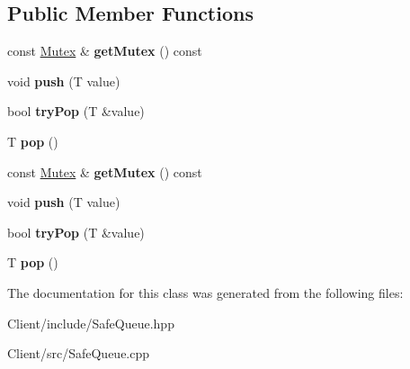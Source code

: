 \subsection*{Public Member Functions}
\begin{DoxyCompactItemize}
\item 
const \hyperlink{class_mutex}{Mutex} \& {\bfseries get\+Mutex} () const \hypertarget{class_safe_queue_aad9b14ab0aaff6244e49d9e408dc04eb}{}\label{class_safe_queue_aad9b14ab0aaff6244e49d9e408dc04eb}

\item 
void {\bfseries push} (T value)\hypertarget{class_safe_queue_adb651a088d5c4cdbfa3183d425323eaa}{}\label{class_safe_queue_adb651a088d5c4cdbfa3183d425323eaa}

\item 
bool {\bfseries try\+Pop} (T \&value)\hypertarget{class_safe_queue_ab2f40bad1a39f332c1a8c7b4e858b190}{}\label{class_safe_queue_ab2f40bad1a39f332c1a8c7b4e858b190}

\item 
T {\bfseries pop} ()\hypertarget{class_safe_queue_a0e893adb076b76dfce803b068af53482}{}\label{class_safe_queue_a0e893adb076b76dfce803b068af53482}

\item 
const \hyperlink{class_mutex}{Mutex} \& {\bfseries get\+Mutex} () const \hypertarget{class_safe_queue_a98cf46e343ed213b69368d10aaf76058}{}\label{class_safe_queue_a98cf46e343ed213b69368d10aaf76058}

\item 
void {\bfseries push} (T value)\hypertarget{class_safe_queue_adb651a088d5c4cdbfa3183d425323eaa}{}\label{class_safe_queue_adb651a088d5c4cdbfa3183d425323eaa}

\item 
bool {\bfseries try\+Pop} (T \&value)\hypertarget{class_safe_queue_ab2f40bad1a39f332c1a8c7b4e858b190}{}\label{class_safe_queue_ab2f40bad1a39f332c1a8c7b4e858b190}

\item 
T {\bfseries pop} ()\hypertarget{class_safe_queue_a0e893adb076b76dfce803b068af53482}{}\label{class_safe_queue_a0e893adb076b76dfce803b068af53482}

\end{DoxyCompactItemize}


The documentation for this class was generated from the following files\+:\begin{DoxyCompactItemize}
\item 
Client/include/Safe\+Queue.\+hpp\item 
Client/src/Safe\+Queue.\+cpp\end{DoxyCompactItemize}
